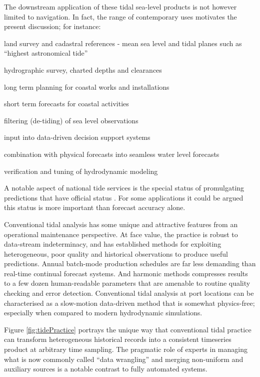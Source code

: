 The downstream application of these tidal sea-level products is not however limited to navigation.   
In fact, the range of contemporary uses motivates the present discussion; for instance:
\begin{inparaenum}[1)]
    \item land survey and cadastral references - mean sea level and tidal planes such as ``highest astronomical tide'' 
    \item hydrographic survey, charted depths and clearances
    \item long term planning for coastal works and installations
    \item short term forecasts for coastal activities 
    \item filtering (de-tiding) of sea level observations
    \item input into data-driven decision support systems
    \item combination with physical forecasts into seamless water level forecasts 
    \item verification and tuning of hydrodynamic modeling
\end{inparaenum}

A notable aspect of national tide services is the special status of promulgating predictions that have official status \cite{AusNavAct2012}.   For some applications it could be argued this status is more important than forecast accuracy alone.
  

Conventional tidal analysis has some unique and attractive features from an operational maintenance perspective.
At face value, the practice is robust to data-stream indeterminacy,  and has established methods for exploiting heterogeneous, poor quality and historical observations to produce useful predictions.  
Annual batch-mode production schedules are far less demanding than real-time continual forecast systems. 
And harmonic methods compresses results to a few dozen human-readable parameters that are amenable to routine quality checking and error detection. 
Conventional tidal analysis at port locations can be characterised as a slow-motion data-driven method that is somewhat physics-free; especially when compared to modern hydrodynamic simulations. 

Figure \ref{fig:tidePractice} portrays the unique way that conventional tidal practice can transform heterogeneous historical records into a consistent timeseries product at arbitrary time sampling.
The pragmatic role of experts in managing what is now commonly  called ``data wrangling'' and merging non-uniform and auxiliary sources is a notable contrast to fully automated systems.
 
